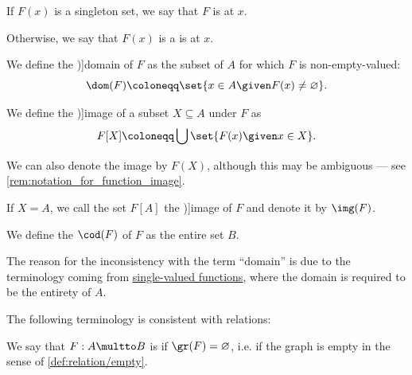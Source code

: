 \begin{definition}
\begin{thmenum}[series=def:set_valued_function]
\begin{thmenum}
       If \( F(x) \) is a singleton set, we say that \( F \) is  at \( x \).

       Otherwise, we say that \( F(x) \) is a is  at \( x \).
    \end{thmenum}

     We define the \term[ru=область определения (\cite[\S 1.2.4]{КусраевКутателадзе2005БулевозначныйАнализ})]{domain} of \( F \) as the subset of \( A \) for which \( F \) is non-empty-valued:
    \begin{equation*}
      \dom(F) \coloneqq \set{ x \in A \given F(x) \neq \varnothing }.
    \end{equation*}

     We define the \term[ru=образ (\cite[\S 1.2.5]{КусраевКутателадзе2005БулевозначныйАнализ})]{image} of a subset \( X \subseteq A \) under \( F \) as
    \begin{equation*}
      F[X] \coloneqq \bigcup \set{ F(x) \given x \in X }.
    \end{equation*}

    We can also denote the image by \( F(X) \), although this may be ambiguous --- see \cref{rem:notation_for_function_image}.

    If \( X = A \), we call the set \( F[A] \) the \term[ru=область значений (\cite[\S 1.2.5]{КусраевКутателадзе2005БулевозначныйАнализ})]{image} of \( F \) and denote it by \( \img(F) \).

     We define the  \( \cod(F) \) of \( F \) as the entire set \( B \).

    The reason for the inconsistency with the term \enquote{domain} is due to the terminology coming from \hyperref[def:function]{single-valued functions}, where the domain is required to be the entirety of \( A \).
  \end{thmenum}

  The following terminology is consistent with relations:
  \begin{thmenum}[resume=def:set_valued_function]
     We say that \( F: A \multto B \) is  if \( \gr(F) = \varnothing \), i.e. if the graph is empty in the sense of \cref{def:relation/empty}.


\end{thmenum}
\end{definition}
